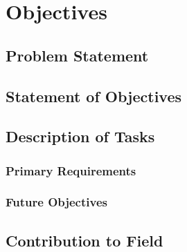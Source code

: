 \chapter{Objectives}
\section{Problem Statement}

\section{Statement of Objectives}

\section{Description of Tasks}
\subsection{Primary Requirements}
\subsection{Future Objectives}

\section{Contribution to Field}